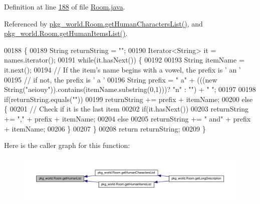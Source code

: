 Definition at line \hyperlink{Room_8java_source_l00188}{188} of file \hyperlink{Room_8java_source}{Room.\-java}.



Referenced by \hyperlink{Room_8java_source_l00179}{pkg\-\_\-world.\-Room.\-get\-Human\-Characters\-List()}, and \hyperlink{Room_8java_source_l00171}{pkg\-\_\-world.\-Room.\-get\-Human\-Items\-List()}.


\begin{DoxyCode}
00188                                                    \{
00189         String returnString = \textcolor{stringliteral}{""};
00190         Iterator<String> it = names.iterator();
00191         \textcolor{keywordflow}{while}(it.hasNext()) \{
00192 
00193             String itemName = it.next();
00194             \textcolor{comment}{// If the item's name begins with a vowel, the prefix is ' an '}
00195             \textcolor{comment}{// if not, the prefix is ' a '}
00196             String prefix = \textcolor{stringliteral}{" a"} + (((\textcolor{keyword}{new} String(\textcolor{stringliteral}{"aeiouy"})).contains(itemName.substring(0,1)))? \textcolor{stringliteral}{"n"} : \textcolor{stringliteral}{""}) +
       \textcolor{stringliteral}{" "};
00197 
00198             \textcolor{keywordflow}{if}(returnString.equals(\textcolor{stringliteral}{""}))
00199                 returnString += prefix + itemName;
00200             \textcolor{keywordflow}{else} \{
00201                 \textcolor{comment}{// Check if it is the last item}
00202                 \textcolor{keywordflow}{if}(it.hasNext())
00203                     returnString += \textcolor{stringliteral}{","} + prefix + itemName;
00204                 \textcolor{keywordflow}{else}
00205                     returnString += \textcolor{stringliteral}{" and"} + prefix + itemName;
00206             \}
00207         \}
00208         \textcolor{keywordflow}{return} returnString;
00209     \}
\end{DoxyCode}


Here is the caller graph for this function\-:\nopagebreak
\begin{figure}[H]
\begin{center}
\leavevmode
\includegraphics[width=350pt]{classpkg__world_1_1Room_a178f912d90e1eb358fe60f7e5e708058_icgraph}
\end{center}
\end{figure}


